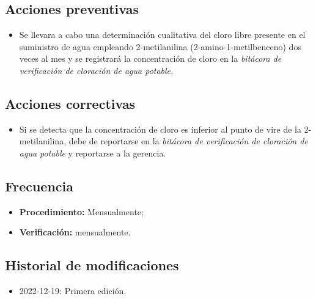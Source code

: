 \subsection{Acciones preventivas}

\begin{itemize}
	\item Se llevara a cabo una determinación cualitativa del cloro libre presente en el suministro de agua empleando 2-metilanilina (2-amino-1-metilbenceno) dos veces al mes y se registrará la concentración de cloro en la \emph{bitácora de verificación de cloración de agua potable.}
\end{itemize}

\subsection{Acciones correctivas}

\begin{itemize}
	\item Si se detecta que la concentración de cloro es inferior al punto de vire de la 2-metilanilina, debe de reportarse en la \emph{bitácora de verificación de cloración de agua potable} y reportarse a la gerencia.
\end{itemize}

\subsection{Frecuencia}

\begin{itemize}
	\item \textbf{Procedimiento:} Mensualmente;
	\item \textbf{Verificación:} mensualmente.
\end{itemize}

\subsection{Historial de modificaciones}

\begin{itemize}
	\item 2022-12-19: Primera edición.
\end{itemize}

